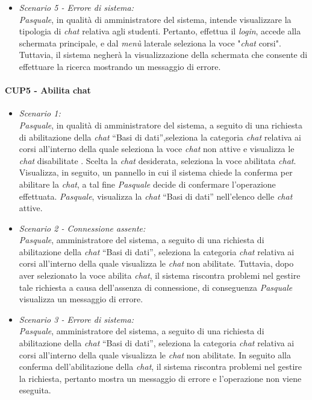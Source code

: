 \begin{itemize}
	\item \textit{Scenario 5 - Errore di sistema:\\}
	\textit{Pasquale}, in qualità di amministratore del sistema, intende visualizzare la tipologia di \textit{chat} relativa agli studenti. Pertanto, effettua il \textit{login}, accede alla schermata principale, e dal \textit{menù} laterale seleziona la voce "\textit{chat} corsi". Tuttavia, il sistema negherà la visualizzazione della schermata che consente di effettuare la ricerca mostrando un messaggio di errore.\\
\end{itemize}

\paragraph{CUP5 - Abilita chat\\}
\begin{itemize}
	\item \textit{Scenario 1:\\}
	\textit{Pasquale}, in qualità di amministratore del sistema, a seguito di una richiesta di abilitazione della \textit{chat} “Basi di dati”,seleziona la categoria \textit{chat} relativa ai corsi all’interno della quale seleziona la voce \textit{chat} non attive e visualizza le \textit{chat} disabilitate . Scelta la \textit{chat} desiderata, seleziona la voce abilitata \textit{chat}. Visualizza, in seguito, un pannello in cui il sistema chiede la conferma per abilitare la \textit{chat}, a tal fine \textit{Pasquale} decide di confermare l’operazione effettuata. \textit{Pasquale}, visualizza la \textit{chat} “Basi di dati” nell’elenco delle \textit{chat} attive.\\
	
	\item \textit{Scenario 2 - Connessione assente:\\}
	\textit{Pasquale}, amministratore del sistema, a seguito di una richiesta di abilitazione della \textit{chat} “Basi di dati”, seleziona la categoria \textit{chat} relativa ai corsi all’interno della quale visualizza le \textit{chat} non abilitate. Tuttavia, dopo aver selezionato la voce abilita \textit{chat}, il sistema riscontra problemi nel gestire tale richiesta a causa dell’assenza di connessione, di conseguenza \textit{Pasquale} visualizza un messaggio di errore.\\
	
	\item \textit{Scenario 3 -  Errore di sistema:\\}
	\textit{Pasquale}, amministratore del sistema, a seguito di una richiesta di abilitazione della \textit{chat} “Basi di dati”, seleziona la categoria \textit{chat} relativa ai corsi all’interno della quale visualizza le \textit{chat} non abilitate.  In seguito alla conferma dell’abilitazione della \textit{chat}, il sistema riscontra problemi nel gestire la richiesta, pertanto mostra un messaggio di errore e l’operazione non viene eseguita.
\end{itemize}

